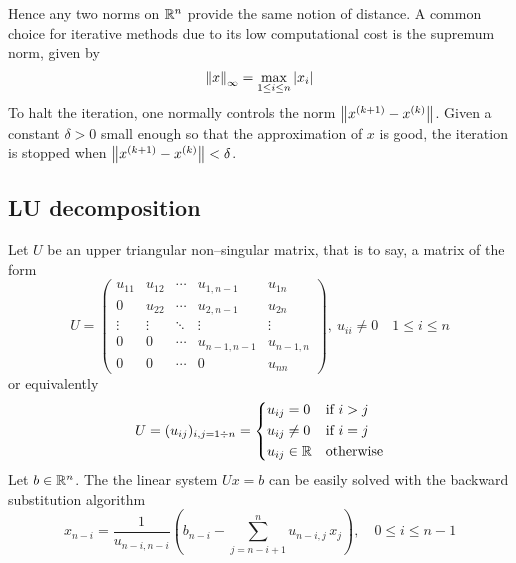 \noindent
Hence any two norms on $\mathbb{R}^n$ provide the same notion of distance. A common
choice for iterative methods due to its low computational cost is the supremum
norm, given by
\begin{equation*}
    \norm{x}_\infty = \max_{1 \leq i \leq n} \abs{x_i}
\end{equation*}
To halt the iteration, one normally controls the norm $\norm{x^{(k+1)} -
x^{(k)}}$. Given a constant $\delta > 0$ small enough so that the approximation
of $x$ is good, the iteration is stopped when $\norm{x^{(k+1)} - x^{(k)}} <
\delta$.


\subsection{LU decomposition}

Let $U$ be an upper triangular non--singular matrix, that is to say, a matrix of
the form
\begin{equation*}
	U = 
	\begin{pmatrix}
		u_{11} 	& u_{12} & \cdots & u_{1,n-1} & u_{1n} \\
		0		& u_{22} & \cdots & u_{2,n-1} & u_{2n} \\
		\vdots	& \vdots & \ddots & \vdots 	  & \vdots \\
		0 		& 0		 & \cdots & u_{n-1,n-1} & u_{n-1,n} \\
		0 	   	& 0		 & \cdots & 0 			& u_{nn}
	\end{pmatrix},
	\
	u_{ii} \neq 0 \quad 1 \leq i \leq n
\end{equation*}
or equivalently
\begin{equation*}
	U = (u_{ij})_{i, j= 1 \divisionsymbol n} = 
	\left\{
	\begin{aligned}
		&u_{ij} = 0 		& 	&\text{if } i > j \\
		&u_{ij} \neq 0 		& 	&\text{if } i = j \\
		&u_{ij} \in \real 	& 	&\text{otherwise} 
	\end{aligned}
	\right.
\end{equation*}
Let $b \in \mathbb{R}^n$. The the linear system $U x = b$ can be easily solved with
the backward substitution algorithm
\begin{equation*}
	x_{n-i} =
	\frac{1}{u_{n-i,n-i}}
	\left(
	b_{n-i} - \sum_{j=n-i+1}^{n} u_{n-i,j} \, x_j
	\right),
	\quad 0 \leq i \leq n-1
\end{equation*}


